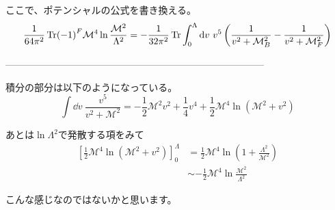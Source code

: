 \documentclass[
  unicode,a4paper,9pt,
  xcolor = {dvipsnames,svgnames},
  hyperref ={colorlinks=true,citecolor=Navy,linkcolor=NavyBlue,urlcolor=purple},
  ja=standard,lualatex
]{beamer}
\begin{document}
\begin{frame}

  ここで、ポテンシャルの公式を書き換える。
  \begin{equation}
    \frac{1}{64\pi^2}
    \Tr (-1)^{F}
    \mathcal{M}^{4}\ln\frac{\mathcal{M}^2}{\Lambda^{2}}
    =
    -\frac{1}{32\pi^2}
    \Tr\int^{\Lambda}_{0}\dd v\
    v^5\left( \frac{1}{v^2+\mathcal{M}_{B}^2}-\frac{1}{v^2+\mathcal{M}_{F}^2} \right)
    \nonumber
  \end{equation}

  ---------------------------------------------------------------------------------

  積分の部分は以下のようになっている。
  \begin{equation}
    \int\dd v\
    \frac{v^5}{v^2+\mathcal{M}^2}
    =
    -\frac{1}{2}\mathcal{M}^2 v^2
    +
    \frac{1}{4}v^4
    +
    \frac{1}{2}\mathcal{M}^4\ln(\mathcal{M}^2+v^2)
    \nonumber
  \end{equation}

  あとは$\ln \Lambda^2$で発散する項をみて
  \begin{align}
    \left[
      \frac{1}{2}\mathcal{M}^4\ln(\mathcal{M}^2+v^2)
      \right]_{0}^{\Lambda}
     & =
    \frac{1}{2}\mathcal{M}^4\ln\left( 1+\frac{\Lambda^2}{\mathcal{M}^2} \right)
    \nonumber
    \\
     & \sim
    -
    \frac{1}{2}\mathcal{M}^4\ln\frac{\mathcal{M}^2}{\Lambda^2}
    \nonumber
  \end{align}

  こんな感じなのではないかと思います。

\end{frame}
\end{document}
